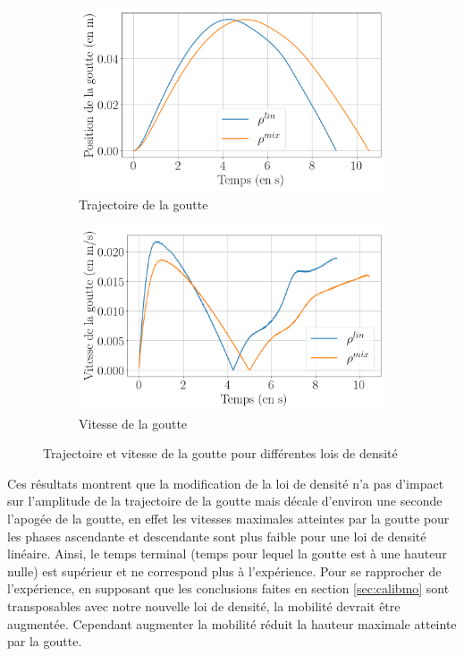 \begin{figure}[H] 
	\centering
	\begin{subfigure}[H]{0.47\textwidth}
		\centering
		\includegraphics[width=\textwidth]{figure/influence_DensityLaw_position.png}
		\caption{Trajectoire de la goutte}

	\end{subfigure} 
	\begin{subfigure}[H]{0.47\textwidth}
		\centering
		\includegraphics[width=\textwidth]{figure/influence_DensityLaw_vitesse.png}
		\caption{Vitesse de la goutte}
	\end{subfigure}
	\caption{Trajectoire et vitesse de la goutte pour différentes lois de densité}
	\label{fig:resultat_rhomix}
\end{figure}
Ces résultats montrent que la modification de la loi de densité n'a pas d'impact sur l'amplitude de la trajectoire de la goutte mais décale d'environ une seconde l'apogée de la goutte, en effet les vitesses maximales atteintes par la goutte pour les phases ascendante et descendante sont plus faible pour une loi de densité linéaire. Ainsi, le temps terminal (temps pour lequel la goutte est à une hauteur nulle) est supérieur et ne correspond plus à l'expérience. Pour se rapprocher de l'expérience, en supposant que les conclusions faites en section \ref{sec:calibmo} sont transposables avec notre nouvelle loi de densité, la mobilité devrait être augmentée. Cependant augmenter la mobilité réduit la hauteur maximale atteinte par la goutte. 
